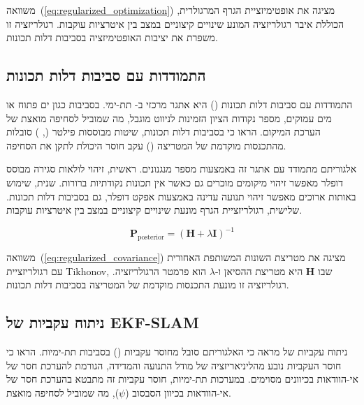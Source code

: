 משוואה~(\ref{eq:regularized_optimization}) מציגה את אופטימיזציית הגרף המרגולרית, הכוללת איבר רגולריזציה המונע שינויים קיצוניים במצב בין איטרציות עוקבות. רגולריזציה זו משפרת את יציבות האופטימיזציה בסביבות דלות תכונות.

\subsection{התמודדות עם סביבות דלות תכונות}
\label{sec:feature_poor_environments}

התמודדות עם סביבות דלות תכונות () היא אתגר מרכזי ב- תת-ימי. בסביבות כגון ים פתוח או מים עמוקים, מספר נקודות הציון הזמינות לניווט מוגבל, מה שמוביל לסחיפה מואצת של הערכת המיקום. \citet{Thrun2005ProbRobotics} הראו כי בסביבות דלות תכונות, שיטות מבוססות פילטר (, ) סובלות מהתכנסות מוקדמת של המטריצה () עקב חוסר היכולת לתקן את הסחיפה.

אלגוריתם  מתמודד עם אתגר זה באמצעות מספר מנגנונים. ראשית, זיהוי לולאות סגירה מבוסס דופלר מאפשר זיהוי מיקומים מוכרים גם כאשר אין תכונות נקודתיות ברורות. שנית, שימוש באותות  ארוכים מאפשר זיהוי תנועה עדינה באמצעות אפקט דופלר, גם בסביבות דלות תכונות. שלישית, רגולריזציית הגרף מונעת שינויים קיצוניים במצב בין איטרציות עוקבות.

\begin{equation}
\mathbf{P}_{\text{posterior}} = (\mathbf{H} + \lambda \mathbf{I})^{-1}
\label{eq:regularized_covariance}
\end{equation}

משוואה~(\ref{eq:regularized_covariance}) מציגה את מטריצת השונות המשותפת האחורית עם רגולריזציית Tikhonov, שבו $\mathbf{H}$ היא מטריצת ההסיאן ו-$\lambda$ הוא פרמטר הרגולריזציה. רגולריזציה זו מונעת התכנסות מוקדמת של המטריצה בסביבות דלות תכונות.

\subsection{ניתוח עקביות של EKF-SLAM}
\label{sec:consistency_analysis}

ניתוח עקביות של  מראה כי האלגוריתם סובל מחוסר עקביות () בסביבות תת-ימיות. \citet{Julier1997CovarianceIntersection} הראו כי חוסר העקביות נובע מהליניאריזציה של מודל התנועה והמדידה, הגורמת להערכת חסר של אי-הוודאות בכיוונים מסוימים. במערכות תת-ימיות, חוסר עקביות זה מתבטא בהערכת חסר של אי-הוודאות בכיוון הסבסוב ($\psi$), מה שמוביל לסחיפה מואצת.

